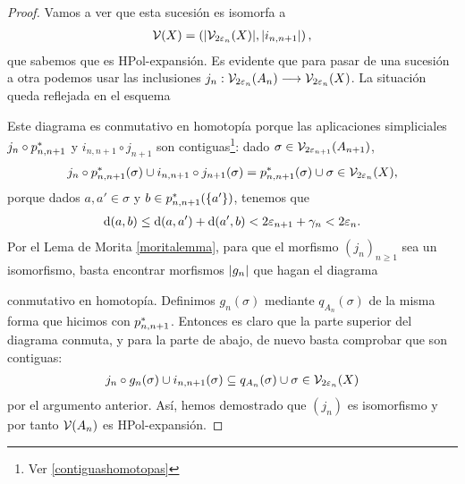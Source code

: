 \begin{proof}
  Vamos a ver que esta sucesión es isomorfa a 
  \begin{gather*}
      \mathcal{V}(X) =  \left(\abs{\mathcal{V}_{2\varepsilon_n }(X )},\abs{i_{n,n+1}}\right),
  \end{gather*} que sabemos que es HPol-expansión. Es evidente que para pasar de una sucesión a otra podemos usar las inclusiones $ j_n :\mathcal{V}_{2\varepsilon_n}(A_n)\longrightarrow \mathcal{V}_{2\varepsilon_n}(X)$. La situación queda reflejada en el esquema
  \begin{center}
  \end{center}
  Este diagrama es conmutativo en homotopía porque las aplicaciones simpliciales $ j_n\circ p_{n,n+1}^* $ y $ i_{n,n+1}\circ j_{n+1} $ son contiguas\footnote{Ver \ref{contiguashomotopas} }: dado $ \sigma \in \mathcal{V}_{2\varepsilon_{n+1}}(A_{n+1}) $, 
  \begin{gather*}
    j_n\circ p_{n,n+1}^*(\sigma)\cup i_{n,n+1}\circ j_{n+1}(\sigma) = p_{n,n+1}^*(\sigma)\cup \sigma  \in \mathcal{V}_{2\varepsilon_n}(X),
  \end{gather*}
  porque dados $ a,a'\in \sigma  $ y $ b \in  p_{n,n+1}^*(\{a' \}) $, tenemos que 
  \begin{gather*}
    \dd (a,b) \leq \dd (a,a')+\dd (a',b) <2\varepsilon_{n+1}+\gamma_n <2\varepsilon _n .
  \end{gather*}
  Por el Lema de Morita \ref{moritalemma}, para que el morfismo $ (j_n)_{n\geq 1 } $ sea un isomorfismo, basta encontrar morfismos $ \abs{g_n } $ que hagan el diagrama
  \begin{center}
  \end{center} 
  conmutativo en homotopía. Definimos $ g_n (\sigma) $ mediante $q_{A_n}(\sigma) $ de la misma forma que hicimos con $ p_{n,n+1}^*  $. Entonces es claro que la parte superior del diagrama conmuta, y para la parte de abajo, de nuevo basta comprobar que son contiguas:
  \begin{gather*}
    j_n\circ g_n (\sigma)\cup i_{n,n+1}(\sigma) \subseteq q_{A_n}(\sigma)\cup \sigma \in \mathcal{V}_{2\varepsilon_n}(X) 
  \end{gather*}
  por el argumento anterior. Así, hemos demostrado que $ (j_n ) $ es isomorfismo y por tanto $ \mathcal{V}(A_n ) $ es HPol-expansión.
\end{proof}

